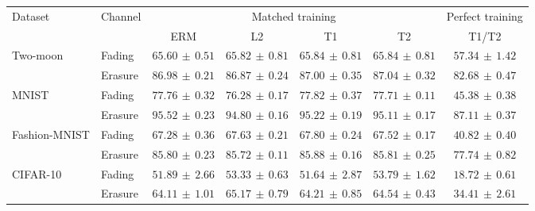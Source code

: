 \begin{tabular*}{\linewidth}{@{\extracolsep{\fill}}llccccc@{}}
\toprule
\multirow{2}{*}{Dataset} & \multirow{2}{*}{Channel} & \multicolumn{4}{c}{Matched training} & Perfect training \\
\cmidrule(lr){3-6}\cmidrule(l){7-7}
 & & ERM & L2 & T1 & T2 & T1/T2 \\
\midrule
\multirow{2}{*}{Two-moon} & Fading & $65.60\,\pm\,0.51$ & $65.82\,\pm\,0.81$ & $\mathbf{65.84}\,\pm\,0.81$ & $65.84\,\pm\,0.81$ & $57.34\,\pm\,1.42$ \\
 & Erasure & $86.98\,\pm\,0.21$ & $86.87\,\pm\,0.24$ & $87.00\,\pm\,0.35$ & $\mathbf{87.04}\,\pm\,0.32$ & $82.68\,\pm\,0.47$ \\
\midrule[0.25pt]
\multirow{2}{*}{MNIST} & Fading & $77.76\,\pm\,0.32$ & $76.28\,\pm\,0.17$ & $\mathbf{77.82}\,\pm\,0.37$ & $77.71\,\pm\,0.11$ & $45.38\,\pm\,0.38$ \\
 & Erasure & $\mathbf{95.52}\,\pm\,0.23$ & $94.80\,\pm\,0.16$ & $95.22\,\pm\,0.19$ & $95.11\,\pm\,0.17$ & $87.11\,\pm\,0.37$ \\
\midrule[0.25pt]
\multirow{2}{*}{Fashion-MNIST} & Fading & $67.28\,\pm\,0.36$ & $67.63\,\pm\,0.21$ & $\mathbf{67.80}\,\pm\,0.24$ & $67.52\,\pm\,0.17$ & $40.82\,\pm\,0.40$ \\
 & Erasure & $85.80\,\pm\,0.23$ & $85.72\,\pm\,0.11$ & $\mathbf{85.88}\,\pm\,0.16$ & $85.81\,\pm\,0.25$ & $77.74\,\pm\,0.82$ \\
\midrule[0.25pt]
\multirow{2}{*}{CIFAR-10} & Fading & $51.89\,\pm\,2.66$ & $53.33\,\pm\,0.63$ & $51.64\,\pm\,2.87$ & $\mathbf{53.79}\,\pm\,1.62$ & $18.72\,\pm\,0.61$ \\
 & Erasure & $64.11\,\pm\,1.01$ & $\mathbf{65.17}\,\pm\,0.79$ & $64.21\,\pm\,0.85$ & $64.54\,\pm\,0.43$ & $34.41\,\pm\,2.61$ \\
\bottomrule
\end{tabular*}
